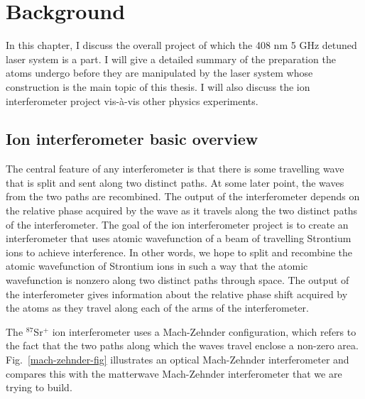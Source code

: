 
\chapter{Background}
In this chapter, I discuss the overall project of which the 408 nm 5 GHz detuned laser system is a part. I will give a detailed summary of the preparation the atoms undergo before they are manipulated by the laser system whose construction is the main topic of this thesis. I will also discuss the ion interferometer project vis-\`a-vis other physics experiments. 

\section{Ion interferometer basic overview}
The central feature of any interferometer is that there is some travelling wave that is split and sent along two distinct paths. At some later point, the waves from the two paths are recombined. The output of the interferometer depends on the relative phase acquired by the wave as it travels along the two distinct paths of the interferometer.
The goal of the ion interferometer project is to create an interferometer that uses atomic wavefunction of a beam of travelling Strontium ions to achieve interference.
In other words, we hope to split and recombine the atomic wavefunction of Strontium ions in such a way that the atomic wavefunction is nonzero along two distinct paths through space. 
The output of the interferometer gives information about the relative phase shift acquired by the atoms as they travel along each of the arms of the interferometer. 

The $^{87}$Sr$^+$ ion interferometer uses a Mach-Zehnder configuration, which refers to the fact that the two paths along which the waves travel enclose a non-zero area. Fig.\ \ref{mach-zehnder-fig} illustrates an optical Mach-Zehnder interferometer and compares this with the matterwave Mach-Zehnder interferometer that we are trying to build.

